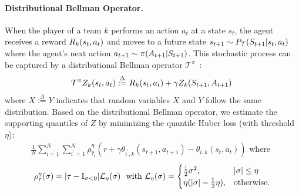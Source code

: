 \documentclass{article}
\newcommand{\state}{s}
\newcommand{\action}{a}
\newcommand{\transition}{t}
\newcommand{\reward}{r}
\newcommand{\agentIndex}{k}
\newcommand{\quantielIndex}{i}
\newcommand{\expect}{\mathbb{E}}
\begin{document}
\paragraph{Distributional Bellman Operator.}
When the player of a team $\agentIndex$ performs an action $\action_t$
at a state $\state_t$, the agent receives a reward $\MakeUppercase{\reward}_{\agentIndex}(\state_t,\action_t)$ and moves to a future state $\state_{t+1}\sim P_{\mathcal{\MakeUppercase{\transition}}}(\MakeUppercase{\state}_{t+1}|\state_t,\action_t)$ where the agent's next action $\action_{t+1}\sim\pi(\MakeUppercase{\action}_{t+1}|\MakeUppercase{\state}_{t+1})$. This stochastic process can be captured by a distributional Bellman operator $\mathcal{T}^{\pi}$~\cite{bellemare2017distributional}:
\vspace{-0.1in}
\begin{equation}
    \mathcal{T}^{\pi}{Z}_{\agentIndex}(\state_t,\action_t) \overset{\Delta}{:=} \MakeUppercase{\reward}_{\agentIndex}(\state_t,\action_t) + \gamma {Z}_{\agentIndex}(\MakeUppercase{\state}_{t+1},\MakeUppercase{\action}_{t+1})~\label{eqn:bellman-operator}
\end{equation}
where $X\overset{\Delta}{:=}Y$ indicates that random variables $X$ and $Y$ follow the same distribution.
Based on the distributional Bellman operator, we estimate the supporting quantiles of $Z$ by minimizing the quantile Huber loss (with threshold $\eta$):
\vspace{-0.05in}
\begin{align}
    \frac{1}{N}\sum_{\quantielIndex=1}^N\sum_{\quantielIndex^{\prime}=1}^N\rho^{\eta}_{\hat{\tau}_\quantielIndex}(\reward+\gamma\theta_{\quantielIndex^{\prime},\agentIndex}(\state_{t+1},\action_{t+1})-\theta_{\quantielIndex,\agentIndex}(\state_{t},\action_{t})) \text{ where }\nonumber~\label{eq:huber}
\end{align}\vspace{-0.2in}
\begin{align}
    \begin{split}
    \rho_{\tau}^{\eta}(\sigma) = |\tau - \mathbb{I}_{\sigma<0}|\mathcal{L}_{\eta}(\sigma)~\text{ with }
    \mathcal{L}_{\eta}(\sigma) = \begin{cases}
    \tfrac12 \sigma^2, & |\sigma| \leq \eta\\
    \eta(|\sigma|-\frac12 \eta), & \mathrm{otherwise}.
\end{cases}
\end{split}
\vspace{-0.05in}
\end{align}
\end{document}

